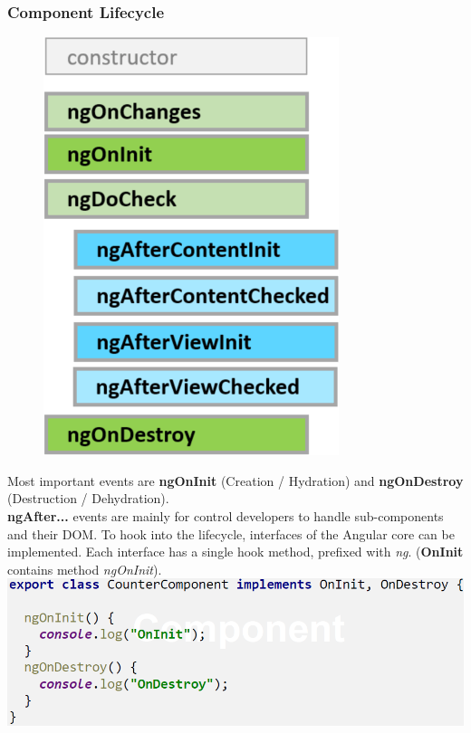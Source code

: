 \subsubsection{Component Lifecycle}
\begingroup
\setlength{\intextsep}{0pt}
\setlength{\columnsep}{20pt}
\begin{figure}
    \centering
    \includegraphics[width=0.7\linewidth]{img/angular_component_lifecycle.png}
\end{figure}
Most important events are \textbf{ngOnInit} (Creation / Hydration) and \textbf{ngOnDestroy} (Destruction / Dehydration).\\
\textbf{ngAfter...} events are mainly for control developers to handle sub-components and their DOM.
To hook into the lifecycle, interfaces of the Angular core can be implemented.
Each interface has a single hook method, prefixed with \textit{ng}. (\textbf{OnInit} contains method \textit{ngOnInit}).\\

\endgroup
\includegraphics[width=0.7\linewidth]{img/angular_component_lifecycle2.png}


